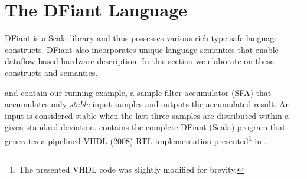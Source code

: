 \section{The DFiant Language}
\label{sec:dfiant}
DFiant is a Scala library and thus possesses various rich type safe language constructs. DFiant also incorporates unique language semantics that enable dataflow-based hardware description. In this section we elaborate on these constructs and semantics. 

 and  contain our running example, a sample filter-accumulator (SFA) that accumulates only \textit{stable} input samples and outputs the accumulated result. An input is considered stable when the last three samples are distributed within a given standard deviation.  contains the complete DFiant (Scala) program that generates a pipelined VHDL (2008) RTL implementation presented\footnote{The presented VHDL code was slightly modified for brevity.} in .

